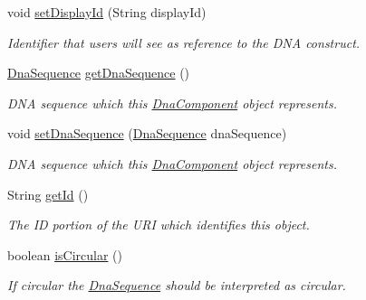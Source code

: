 \begin{DoxyCompactItemize}
void \hyperlink{classorg_1_1sbolstandard_1_1lib_s_b_o_lj_1_1_dna_component_a46b93a70e7bd612a7b429aac4829bc88}{setDisplayId} (String displayId)
\begin{DoxyCompactList}\small\item\em Identifier that users will see as reference to the DNA construct. \item\end{DoxyCompactList}\item 
\hyperlink{classorg_1_1sbolstandard_1_1lib_s_b_o_lj_1_1_dna_sequence}{DnaSequence} \hyperlink{classorg_1_1sbolstandard_1_1lib_s_b_o_lj_1_1_dna_component_a596826001de0d3a682c2effa7fd6d50d}{getDnaSequence} ()
\begin{DoxyCompactList}\small\item\em DNA sequence which this \hyperlink{classorg_1_1sbolstandard_1_1lib_s_b_o_lj_1_1_dna_component}{DnaComponent} object represents. \item\end{DoxyCompactList}\item 
void \hyperlink{classorg_1_1sbolstandard_1_1lib_s_b_o_lj_1_1_dna_component_a2e16af0dece16378b9ee31d818bd8ef1}{setDnaSequence} (\hyperlink{classorg_1_1sbolstandard_1_1lib_s_b_o_lj_1_1_dna_sequence}{DnaSequence} dnaSequence)
\begin{DoxyCompactList}\small\item\em DNA sequence which this \hyperlink{classorg_1_1sbolstandard_1_1lib_s_b_o_lj_1_1_dna_component}{DnaComponent} object represents. \item\end{DoxyCompactList}\item 
String \hyperlink{classorg_1_1sbolstandard_1_1lib_s_b_o_lj_1_1_dna_component_aab219518f0eaf3db55b6a62ad6b49407}{getId} ()
\begin{DoxyCompactList}\small\item\em The ID portion of the URI which identifies this object. \item\end{DoxyCompactList}\item 
boolean \hyperlink{classorg_1_1sbolstandard_1_1lib_s_b_o_lj_1_1_dna_component_a38c303dc9a19b2789b973aea68824e1e}{isCircular} ()
\begin{DoxyCompactList}\small\item\em If circular the \hyperlink{classorg_1_1sbolstandard_1_1lib_s_b_o_lj_1_1_dna_sequence}{DnaSequence} should be interpreted as circular. \item\end{DoxyCompactList}\item 

\end{DoxyCompactItemize}
